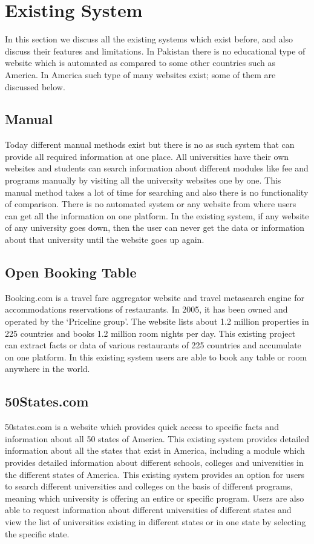 \section{Existing System}

In this section we discuss all the existing systems which exist before, and also discuss their features and limitations. In Pakistan there is no educational type of website which is automated as compared to some other countries such as America. In America such type of many websites exist; some of them are discussed below.

\subsection{Manual}

Today different manual methods exist but there is no as such system that can provide all required information at one place. All universities have their own websites and students can search information about different modules like fee and programs manually by visiting all the university websites one by one. This manual method takes a lot of time for searching and also there is no functionality of comparison. There is no automated system or any website from where users can get all the information on one platform. In the existing system, if any website of any university goes down, then the user can never get the data or information about that university until the website goes up again.

\subsection{Open Booking Table}

Booking.com is a travel fare aggregator website and travel metasearch engine for accommodations reservations of restaurants. In 2005, it has been owned and operated by the `Priceline group'. The website lists about 1.2 million properties in 225 countries and books 1.2 million room nights per day. This existing project can extract facts or data of various restaurants of 225 countries and accumulate on one platform. In this existing system users are able to book any table or room anywhere in the world.

\subsection{50States.com}

50states.com is a website which provides quick access to specific facts and information about all 50 states of America. This existing system provides detailed information about all the states that exist in America, including a module which provides detailed information about different schools, colleges and universities in the different states of America. This existing system provides an option for users to search different universities and colleges on the basis of different programs, meaning which university is offering an entire or specific program. Users are also able to request information about different universities of different states and view the list of universities existing in different states or in one state by selecting the specific state.

